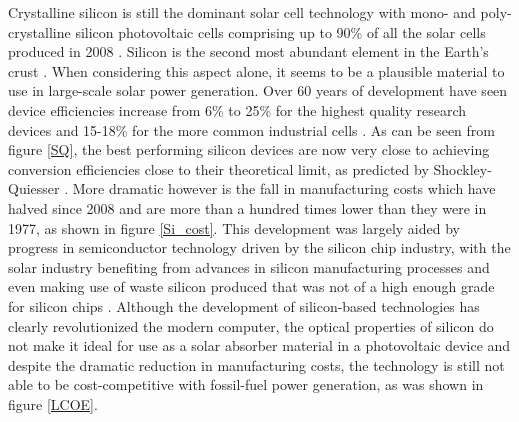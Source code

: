 \documentclass[11pt, twoside]{report}
\begin{document}
Crystalline silicon is still the dominant solar cell technology with mono- and poly-crystalline silicon photovoltaic cells comprising up to 90\% of all the solar cells produced in 2008  \cite{Si_rev}. Silicon is the second most abundant element in the Earth's crust \cite{Si_abundance}. When considering this aspect alone, it seems to be a plausible material to use in large-scale solar power generation. Over 60 years of development have seen device efficiencies increase from 6\% to 25\% for the highest quality research devices and 15-18\% for the more common industrial cells \cite{Si_rev}. As can be seen from figure \ref{SQ}, the best performing silicon devices are now very close to achieving conversion efficiencies close to their theoretical limit, as predicted by Shockley-Quiesser \cite{SQ_1961}. More dramatic however is the fall in manufacturing costs which have halved since 2008 and are more than a hundred times lower than they were in 1977, as shown in figure \ref{Si_cost}. This development was largely aided by progress in semiconductor technology driven by the silicon chip industry, with the solar industry benefiting from advances in silicon manufacturing processes and even making use of waste silicon produced that was not of a high enough grade for silicon chips \cite{PV_history1}. Although the development of silicon-based technologies has clearly revolutionized the modern computer, the optical properties of silicon do not make it ideal for use as a solar absorber material in a photovoltaic device and despite the dramatic reduction in manufacturing costs, the technology is still not able to be cost-competitive with fossil-fuel power generation, as was shown in figure \ref{LCOE}.
\end{document}
